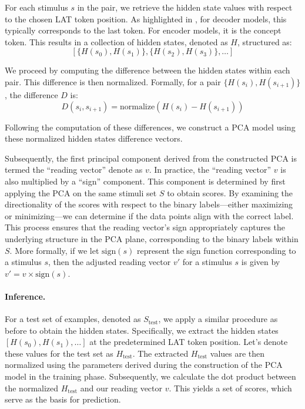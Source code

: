 For each stimulus \( s \) in the pair, we retrieve the hidden state values with respect to the chosen LAT token position. As highlighted in , for decoder models, this typically corresponds to the last token. For encoder models, it is the concept token. This results in a collection of hidden states, denoted as \( H \), structured as:
\[
\left[ \{H(s_0), H(s_1)\}, \{H(s_2), H(s_3)\}, \ldots \right]
\]

We proceed by computing the difference between the hidden states within each pair. This difference is then normalized. Formally, for a pair \( \{H(s_i), H(s_{i+1})\} \), the difference \( D \) is:
\[
D(s_i, s_{i+1}) = \text{normalize}\left( H(s_i) - H(s_{i+1}) \right)
\]

Following the computation of these differences, we construct a PCA model using these normalized hidden states difference vectors.

Subsequently, the first principal component derived from the constructed PCA is termed the ``reading vector'' denote as \( v \). In practice, the ``reading vector'' \( v \) is also multiplied by a ``sign'' component. This component is determined by first applying the PCA on the same stimuli set \( S \) to obtain scores. By examining the directionality of the scores with respect to the binary labels---either maximizing or minimizing---we can determine if the data points align with the correct label. This process ensures that the reading vector's sign appropriately captures the underlying structure in the PCA plane, corresponding to the binary labels within \( S \). More formally, if we let \( \text{sign}(s) \) represent the sign function corresponding to a stimulus \( s \), then the adjusted reading vector \( v' \) for a stimulus \( s \) is given by $v' = v \times \text{sign}(s)$.


\paragraph{Inference.} 
For a test set of examples, denoted as \( S_{\text{test}} \), we apply a similar procedure as before to obtain the hidden states. Specifically, we extract the hidden states \([H(s_0), H(s_1), \ldots]\) at the predetermined LAT token position. Let's denote these values for the test set as \( H_{\text{test}} \). The extracted \( H_{\text{test}} \) values are then normalized using the parameters derived during the construction of the PCA model in the training phase.  Subsequently, we calculate the dot product between the normalized \( H_{\text{test}} \) and our reading vector \( v \). This yields a set of scores, which serve as the basis for prediction.


